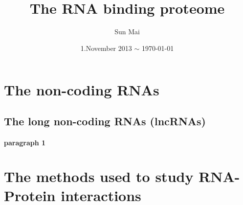 \documentclass[a4paper, 11pt]{article}
\begin{document}
\title{The RNA binding proteome}
\author{Sun Mai}
\date{1.November 2013 $\sim$ \today}
\maketitle

\pagestyle{fancy}
\fancyhead{}
\fancyhead[R]{\slshape \leftmark}
\fancyfoot[C]{\thepage}

\newpage
\tableofcontents

\newpage
\sloppy
\section{The non-coding RNAs}
	\subsection{The long non-coding RNAs (lncRNAs)}
		\paragraph{paragraph 1}
\section{The methods used to study RNA-Protein interactions}


\renewcommand{\bibname}{References} %
\end{document}
